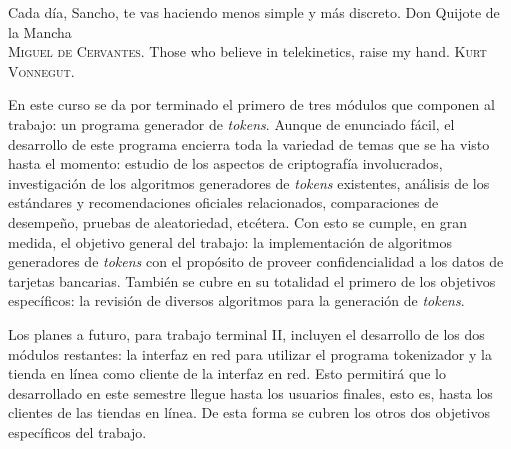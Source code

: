 %
%

{
  \epigrafe
  {%
    Cada día, Sancho, te vas haciendo menos simple y más discreto.%
  }
  {%
    Don Quijote de la Mancha \\
    \textsc{Miguel de Cervantes}.%
  }
  \epigrafe
  {%
    Those who believe in telekinetics, raise my hand.%
  }
  {%
    \textsc{Kurt Vonnegut}.%
  }
}

\noindent
En este curso se da por terminado el primero de tres módulos que componen al
trabajo: un programa generador de \textit{tokens}. Aunque de enunciado fácil,
el desarrollo de este programa encierra toda la variedad de temas que se ha
visto hasta el momento: estudio de los aspectos de criptografía involucrados,
investigación de los algoritmos generadores de \textit{tokens} existentes,
análisis de los estándares y recomendaciones oficiales relacionados,
comparaciones de desempeño, pruebas de aleatoriedad, etcétera. Con esto se
cumple, en gran medida, el objetivo general del trabajo: la implementación de
algoritmos generadores de \textit{tokens} con el propósito de proveer
confidencialidad a los datos de tarjetas bancarias. También se cubre en su
totalidad el primero de los objetivos específicos: la revisión de diversos
algoritmos para la generación de \textit{tokens}.

Los planes a futuro, para trabajo terminal II, incluyen el desarrollo de los
dos módulos restantes: la interfaz en red para utilizar el programa tokenizador
y la tienda en línea como cliente de la interfaz en red. Esto permitirá que lo
desarrollado en este semestre llegue hasta los usuarios finales, esto es, hasta
los clientes de las tiendas en línea. De esta forma se cubren los otros dos
objetivos específicos del trabajo.
